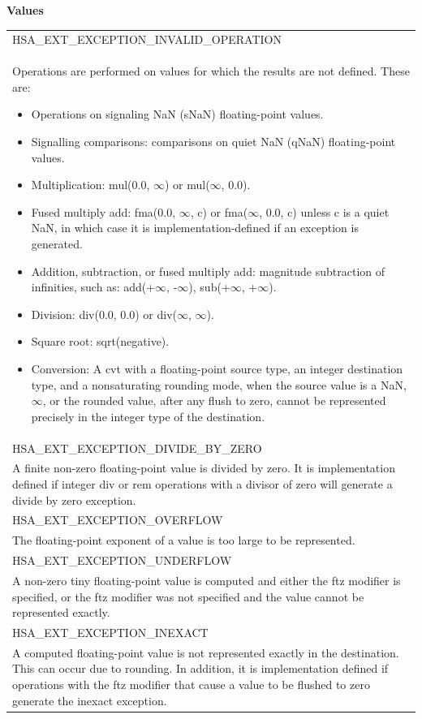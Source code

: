 \documentclass[final,oneside]{book}
\newcommand{\reftyp}[1]{#1}
\newcommand{\refenu}[1]{\reftyp{#1}}
\begin{document}
\noindent\textbf{Values}\\[-5mm]
\begin{longtable}{@{\hspace{2em}}p{\linewidth-2em}}
\hspace{-2em}\refenu{HSA_\-EXT_\-EXCEPTION_\-INVALID_\-OPERATION}\\Operations are performed on values for which the results are not defined. These are:
\begin{itemize}\item Operations on signaling NaN (sNaN) floating-point values.
\item Signalling comparisons: comparisons on quiet NaN (qNaN) floating-point values.
\item Multiplication: mul(0.0, $\infty$) or mul($\infty$, 0.0).
\item Fused multiply add: fma(0.0, $\infty$, c) or fma($\infty$, 0.0, c) unless c is a quiet NaN, in which case it is implementation-defined if an exception is generated.
\item Addition, subtraction, or fused multiply add: magnitude subtraction of infinities, such as: add(+$\infty$, -$\infty$), sub(+$\infty$, +$\infty$).
\item Division: div(0.0, 0.0) or div($\infty$, $\infty$).
\item Square root: sqrt(negative).
\item Conversion: A cvt with a floating-point source type, an integer destination type, and a nonsaturating rounding mode, when the source value is a NaN, $\infty$, or the rounded value, after any flush to zero, cannot be represented precisely in the integer type of the destination. 
\end{itemize}\\[2mm]
\hspace{-2em}\refenu{HSA_\-EXT_\-EXCEPTION_\-DIVIDE_\-BY_\-ZERO}\\A finite non-zero floating-point value is divided by zero. It is implementation defined if integer div or rem operations with a divisor of zero will generate a divide by zero exception.\\[2mm]
\hspace{-2em}\refenu{HSA_\-EXT_\-EXCEPTION_\-OVERFLOW}\\The floating-point exponent of a value is too large to be represented.\\[2mm]
\hspace{-2em}\refenu{HSA_\-EXT_\-EXCEPTION_\-UNDERFLOW}\\A non-zero tiny floating-point value is computed and either the ftz modifier is specified, or the ftz modifier was not specified and the value cannot be represented exactly.\\[2mm]
\hspace{-2em}\refenu{HSA_\-EXT_\-EXCEPTION_\-INEXACT}\\A computed floating-point value is not represented exactly in the destination. This can occur due to rounding. In addition, it is implementation defined if operations with the ftz modifier that cause a value to be flushed to zero generate the inexact exception.
\end{longtable}
\end{document}

